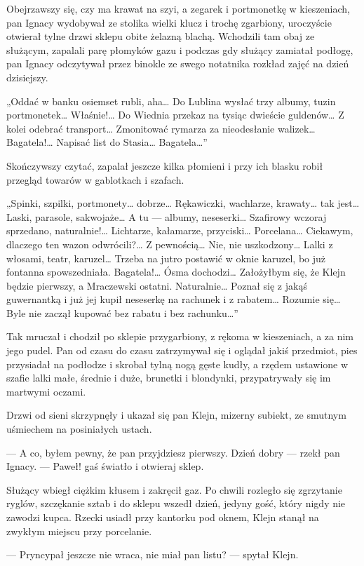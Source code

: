 \documentclass{book}
\begin{document}
Obejrzawszy się, czy ma krawat na szyi, a zegarek i portmonetkę w kieszeniach, pan Ignacy wydobywał ze stolika wielki klucz i trochę zgarbiony, uroczyście otwierał tylne drzwi sklepu obite żelazną blachą. Wchodzili tam obaj ze służącym, zapalali parę płomyków gazu i podczas gdy służący zamiatał podłogę, pan Ignacy odczytywał przez binokle ze swego notatnika rozkład zajęć na dzień dzisiejszy.

„Oddać w banku osiemset rubli, aha… Do Lublina wysłać trzy albumy, tuzin portmonetek… Właśnie!… Do Wiednia przekaz na tysiąc dwieście guldenów… Z kolei odebrać transport… Zmonitować rymarza za nieodesłanie walizek… Bagatela!… Napisać list do Stasia… Bagatela…”

Skończywszy czytać, zapalał jeszcze kilka płomieni i przy ich blasku robił przegląd towarów w gablotkach i szafach.

„Spinki, szpilki, portmonety… dobrze… Rękawiczki, wachlarze, krawaty… tak jest… Laski, parasole, sakwojaże… A tu — albumy, neseserki… Szafirowy wczoraj sprzedano, naturalnie!… Lichtarze, kałamarze, przyciski… Porcelana… Ciekawym, dlaczego ten wazon odwrócili?… Z pewnością… Nie, nie uszkodzony… Lalki z włosami, teatr, karuzel… Trzeba na jutro postawić w oknie karuzel, bo już fontanna spowszedniała. Bagatela!… Ósma dochodzi… Założyłbym się, że Klejn będzie pierwszy, a Mraczewski ostatni. Naturalnie… Poznał się z jakąś guwernantką i już jej kupił neseserkę na rachunek i z rabatem… Rozumie się… Byle nie zaczął kupować bez rabatu i bez rachunku…”

Tak mruczał i chodził po sklepie przygarbiony, z rękoma w kieszeniach, a za nim jego pudel. Pan od czasu do czasu zatrzymywał się i oglądał jakiś przedmiot, pies przysiadał na podłodze i skrobał tylną nogą gęste kudły, a rzędem ustawione w szafie lalki małe, średnie i duże, brunetki i blondynki, przypatrywały się im martwymi oczami.

Drzwi od sieni skrzypnęły i ukazał się pan Klejn, mizerny subiekt, ze smutnym uśmiechem na posiniałych ustach.

— A co, byłem pewny, że pan przyjdziesz pierwszy. Dzień dobry — rzekł pan Ignacy. — Paweł! gaś światło i otwieraj sklep.

Służący wbiegł ciężkim kłusem i zakręcił gaz. Po chwili rozległo się zgrzytanie ryglów, szczękanie sztab i do sklepu wszedł dzień, jedyny gość, który nigdy nie zawodzi kupca. Rzecki usiadł przy kantorku pod oknem, Klejn stanął na zwykłym miejscu przy porcelanie.

— Pryncypał jeszcze nie wraca, nie miał pan listu? — spytał Klejn.
\end{document}
